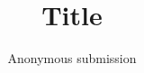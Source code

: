 \documentclass[conference]{IEEEtran}
\begin{document}
\title{Title}
\author{Anonymous submission}

\maketitle


\IEEEpeerreviewmaketitle







\end{document}
